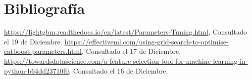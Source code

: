 \documentclass[paper=a4, fontsize=12pt]{article} %
\numberwithin{equation}{section} %
\numberwithin{figure}{section} %
\numberwithin{table}{section} %
\begin{document}
\section{Bibliografía}

\begin{thebibliography}{0}
   \url {https://lightgbm.readthedocs.io/en/latest/Parameters-Tuning.html}, Consultado el 19 de Diciembre.
 \url {https://effectiveml.com/using-grid-search-to-optimise-catboost-parameters.html}, Consultado el 17 de Diciembre.
 \url {https://towardsdatascience.com/a-feature-selection-tool-for-machine-learning-in-python-b64dd23710f0}, Consultado el 16 de Diciembre.

\end{thebibliography}
\end{document}
